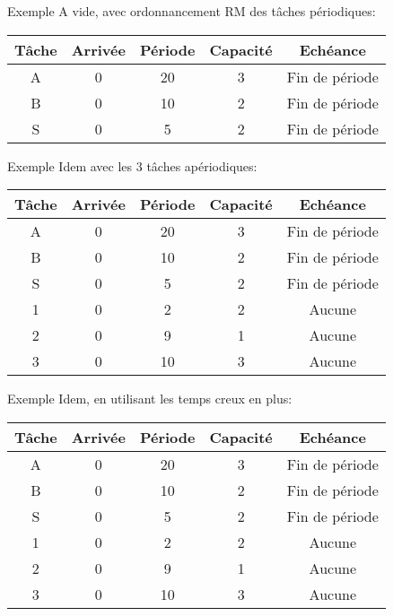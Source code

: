 \begin{frame}{Exemple}
  A vide, avec ordonnancement RM des tâches périodiques:
  \begin{center}
    \begin{tabular}{ccccc}
      \hline
      Tâche & Arrivée & Période & Capacité & Echéance \\
      \hline
      A & 0 & 20 & 3 & Fin de période\\
      B & 0 & 10 & 2 & Fin de période\\
      S & 0 &  5 & 2 & Fin de période\\
      \hline
    \end{tabular}

    
  \end{center} 
\end{frame} 

\begin{frame}{Exemple}
  Idem avec les 3 tâches apériodiques:
  \begin{center}
    \begin{tabular}{ccccc}
      \hline
      Tâche & Arrivée & Période & Capacité & Echéance \\
      \hline
      A & 0 & 20 & 3 & Fin de période\\
      B & 0 & 10 & 2 & Fin de période\\
      S & 0 &  5 & 2 & Fin de période\\
      1 & 0 &  2 & 2 & Aucune\\
      2 & 0 &  9 & 1 & Aucune\\
      3 & 0 & 10 & 3 & Aucune\\
      \hline
    \end{tabular}

    
  \end{center}
\end{frame} 

\begin{frame}{Exemple}
  Idem, en utilisant les temps creux en plus:
  \begin{center}
    \begin{tabular}{ccccc}
      \hline
      Tâche & Arrivée & Période & Capacité & Echéance \\
      \hline
      A & 0 & 20 & 3 & Fin de période\\
      B & 0 & 10 & 2 & Fin de période\\
      S & 0 &  5 & 2 & Fin de période\\
      1 & 0 &  2 & 2 & Aucune\\
      2 & 0 &  9 & 1 & Aucune\\
      3 & 0 & 10 & 3 & Aucune\\
      \hline
    \end{tabular}

    
  \end{center}
\end{frame} 

